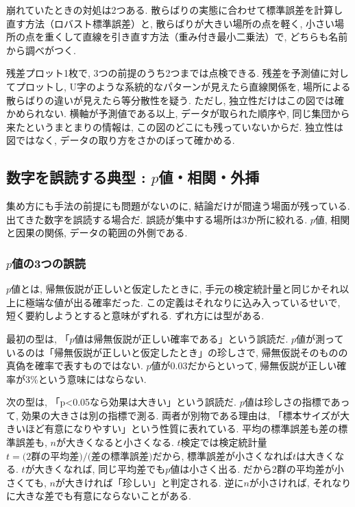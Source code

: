 崩れていたときの対処は2つある.
散らばりの実態に合わせて標準誤差を計算し直す方法（ロバスト標準誤差）と, 散らばりが大きい場所の点を軽く, 小さい場所の点を重くして直線を引き直す方法（重み付き最小二乗法）で, どちらも名前から調べがつく.

残差プロット1枚で, 3つの前提のうち2つまでは点検できる.
残差を予測値に対してプロットし, U字のような系統的なパターンが見えたら直線関係を, 場所による散らばりの違いが見えたら等分散性を疑う.
ただし, 独立性だけはこの図では確かめられない.
横軸が予測値である以上, データが取られた順序や, 同じ集団から来たというまとまりの情報は, この図のどこにも残っていないからだ.
独立性は図ではなく, データの取り方をさかのぼって確かめる.


\subsection{数字を誤読する典型 : \texorpdfstring{$p$}{p}値・相関・外挿}

集め方にも手法の前提にも問題がないのに, 結論だけが間違う場面が残っている.
出てきた数字を誤読する場合だ.
誤読が集中する場所は3か所に絞れる. $p$値, 相関と因果の関係, データの範囲の外側である.

\subsubsection*{\texorpdfstring{$p$}{p}値の3つの誤読}

$p$値とは, 帰無仮説が正しいと仮定したときに, 手元の検定統計量と同じかそれ以上に極端な値が出る確率だった.
この定義はそれなりに込み入っているせいで, 短く要約しようとすると意味がずれる.
ずれ方には型がある.

最初の型は, 「$p$値は帰無仮説が正しい確率である」という誤読だ.
$p$値が測っているのは「帰無仮説が正しいと仮定したとき」の珍しさで, 帰無仮説そのものの真偽を確率で表すものではない.
$p$値が0.03だからといって, 帰無仮説が正しい確率が3\%という意味にはならない.

次の型は, 「p<0.05なら効果は大きい」という誤読だ.
$p$値は珍しさの指標であって, 効果の大きさは別の指標で測る.
両者が別物である理由は, 「標本サイズが大きいほど有意になりやすい」という性質に表れている.
平均の標準誤差も差の標準誤差も, $n$が大きくなると小さくなる.
$t$検定では検定統計量$t = \text{(2群の平均差)}/\text{(差の標準誤差)}$だから, 標準誤差が小さくなれば$t$は大きくなる.
$t$が大きくなれば, 同じ平均差でも$p$値は小さく出る.
だから2群の平均差が小さくても, $n$が大きければ「珍しい」と判定される.
逆に$n$が小さければ, それなりに大きな差でも有意にならないことがある.

